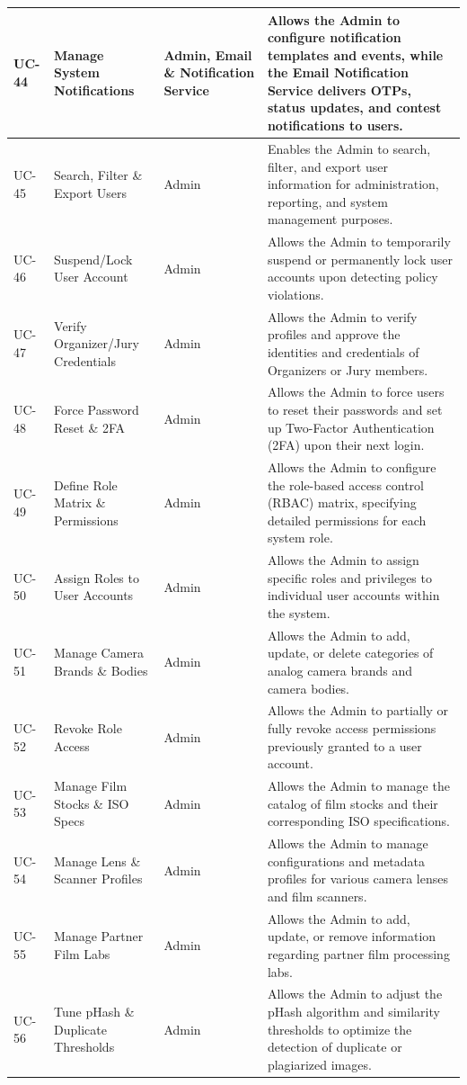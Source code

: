 \begin{longtable}{|>{\centering\arraybackslash}p{}|>{\raggedright\arraybackslash}p{}|>{\raggedright\arraybackslash}p{}|>{\raggedright\arraybackslash}p{}|}
\hline
UC-44 & Manage System Notifications & Admin, Email \& Notification Service & Allows the Admin to configure notification templates and events, while the Email Notification Service delivers OTPs, status updates, and contest notifications to users. \\
\hline
UC-45 & Search, Filter \& Export Users & Admin & Enables the Admin to search, filter, and export user information for administration, reporting, and system management purposes. \\
\hline
UC-46 & Suspend/Lock User Account & Admin & Allows the Admin to temporarily suspend or permanently lock user accounts upon detecting policy violations. \\
\hline
UC-47 & Verify Organizer/Jury Credentials & Admin & Allows the Admin to verify profiles and approve the identities and credentials of Organizers or Jury members. \\
\hline
UC-48 & Force Password Reset \& 2FA & Admin & Allows the Admin to force users to reset their passwords and set up Two-Factor Authentication (2FA) upon their next login. \\
\hline
UC-49 & Define Role Matrix \& Permissions & Admin & Allows the Admin to configure the role-based access control (RBAC) matrix, specifying detailed permissions for each system role. \\
\hline
UC-50 & Assign Roles to User Accounts & Admin & Allows the Admin to assign specific roles and privileges to individual user accounts within the system. \\
\hline
UC-51 & Manage Camera Brands \& Bodies & Admin & Allows the Admin to add, update, or delete categories of analog camera brands and camera bodies. \\
\hline
UC-52 & Revoke Role Access & Admin & Allows the Admin to partially or fully revoke access permissions previously granted to a user account. \\
\hline
UC-53 & Manage Film Stocks \& ISO Specs & Admin & Allows the Admin to manage the catalog of film stocks and their corresponding ISO specifications. \\
\hline
UC-54 & Manage Lens \& Scanner Profiles & Admin & Allows the Admin to manage configurations and metadata profiles for various camera lenses and film scanners. \\
\hline
UC-55 & Manage Partner Film Labs & Admin & Allows the Admin to add, update, or remove information regarding partner film processing labs. \\
\hline
UC-56 & Tune pHash \& Duplicate Thresholds & Admin & Allows the Admin to adjust the pHash algorithm and similarity thresholds to optimize the detection of duplicate or plagiarized images. \\

\end{longtable}
